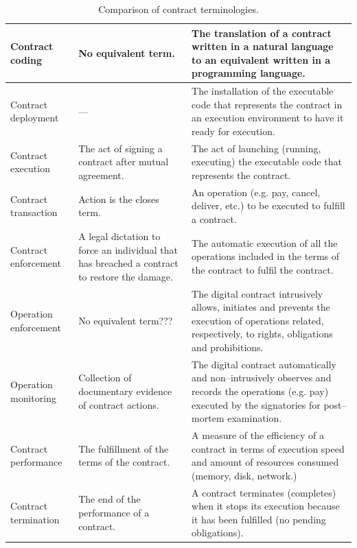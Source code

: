 \documentclass[12pt]{report} %
\begin{document}
\begin{table}
\begin{center}
{\begin{tabular}{|K|Q|Q|}
     
Contract coding
  &  No equivalent term.
  & The translation of a contract written in a natural language to
    an equivalent written in a programming language.\\
     \hline
     
Contract deployment
  &  ---
  & The installation of the executable code that
    represents the contract in an execution
    environment to have it ready for execution.\\
     \hline

 Contract execution
    &  The act of signing a contract after
              mutual agreement.  
    &  The act of launching (running, executing) the executable code 
        that represents the contract.  \\
     \hline
  
  Contract transaction
    &  Action is the closes term. 
    &  An operation (e.g. pay, cancel, deliver, etc.) to be executed to fulfill a
       contract.\\
     \hline
   
  Contract enforcement
    &  A legal dictation to force an individual
       that has breached a contract to restore the damage. 
    &  The automatic execution of all the
       operations included in the terms of the contract
       to fulfil the contract.  \\
     \hline 
  
  
   Operation enforcement
    &  No equivalent term???
    &  The digital contract intrusively allows,
       initiates and prevents the execution of 
       operations related, respectively,  to
       rights, obligations and prohibitions. \\
     \hline 
     
  Operation monitoring
    &  Collection of documentary evidence of contract actions. 
    &  The digital contract automatically and non--intrusively observes 
       and  records the operations (e.g. pay) executed by the
       signatories for post--mortem examination. \\
     \hline 
   
 Contract performance
   &  The fulfillment of the terms of the contract. 
   &  A measure of the efficiency of a contract in terms
      of execution speed and amount of resources consumed (memory,
      disk, network.)\\
     \hline 
     
  Contract termination 
   &  The end of the performance of a contract.
   &  A contract terminates (completes) when it stops its
      execution because it has been fulfilled
      (no pending obligations).\\
     \hline 
     
      
   
  \end{tabular}
  } %
 \end{center}
 \caption{Comparison of contract terminologies.}
 \label{table:termcompa}
\end{table}
 
\end{document}
